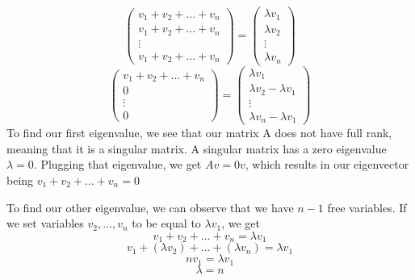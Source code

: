 \documentclass{article}
\begin{document}
\begin{enumerate}
$$                $$
                $$
                    \begin{pmatrix}
                        v_1 + v_2 + \dots + v_n \\
                        v_1 + v_2 + \dots + v_n \\
                        \vdots \\
                        v_1 + v_2 + \dots + v_n
                    \end{pmatrix}
                    =
                    \begin{pmatrix}\lambda v_1 \\ \lambda v_2 \\ \vdots \\ \lambda v_n\end{pmatrix} 
                $$
                $$
                    \begin{pmatrix}
                        v_1 + v_2 + \dots + v_n \\
                        0 \\
                        \vdots \\
                        0
                    \end{pmatrix}
                    =
                    \begin{pmatrix}\lambda v_1 \\ \lambda v_2 - \lambda v_1 \\ \vdots \\ \lambda v_n - \lambda v_1\end{pmatrix} 
                $$
            To find our first eigenvalue, we see that our matrix A does not have full rank, meaning that it is a singular matrix. A singular matrix has a zero eigenvalue $\lambda = 0$.
            Plugging that eigenvalue, we get $Av = 0v$, which results in our eigenvector being $v_1 + v_2 + \dots + v_n = 0$ 

            To find our other eigenvalue, we can observe that we have $n-1$ free variables. If we set variables $v_2, \dots, v_n$ to be equal to $\lambda v_1$, we get 
            $$v_1 + v_2 + \dots + v_n = \lambda v_1$$
            $$v_1 + (\lambda v_2) + \dots + (\lambda v_n) = \lambda v_1$$
            $$nv_1 = \lambda v_1$$
            $$\lambda = n$$


\end{enumerate}
\end{document}
